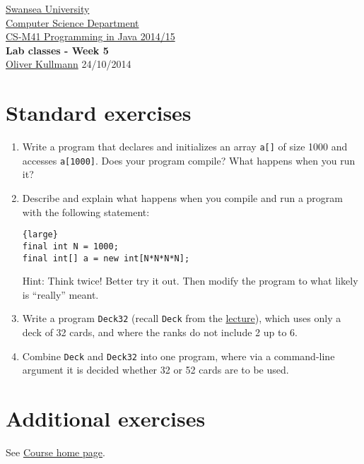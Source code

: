 \documentclass[11pt]{article}
\newcommand{\Java}{\lstset{language=Java,keywordstyle=\bfseries,breaklines,breakindent=30pt}}
\begin{document}
\begin{center}
  \href{http://www.swan.ac.uk/}{Swansea University}\\
  \href{http://www.swan.ac.uk/compsci/}{Computer Science Department}\\[1ex]
  \href{http://cs.swan.ac.uk/~csoliver/ProgrammingJava201415_MgQxuCUrrS/index.html}{CS-M41 Programming in Java 2014/15}\\[1ex]
  \textbf{Lab classes - Week 5}\\
  \href{http://cs.swan.ac.uk/~csoliver}{Oliver Kullmann} 24/10/2014
\end{center}

\section{Standard exercises}
\label{sec:stdex}

\Java

\begin{enumerate}
\item Write a program that declares and initializes an array \texttt{a[]} of size 1000 and accesses \texttt{a[1000]}. Does your program compile? What happens when you run it?
\item Describe and explain what happens when you compile and run a program with the following statement:
  \begin{lstlisting}{large}
final int N = 1000;
final int[] a = new int[N*N*N*N];
  \end{lstlisting}
  Hint: Think twice! Better try it out. Then modify the program to what likely is ``really'' meant.
\item Write a program \texttt{Deck32} (recall \texttt{Deck} from the \href{http://cs.swan.ac.uk/~csoliver/ProgrammingJava201415_MgQxuCUrrS/index.html#LecturesWeek05}{lecture}), which uses only a deck of 32 cards, and where the ranks do not include 2 up to 6.
\item Combine \texttt{Deck} and \texttt{Deck32} into one program, where via a command-line argument it is decided whether 32 or 52 cards are to be used.
\end{enumerate}


\section{Additional exercises}
\label{sec:addex}

See \href{http://cs.swan.ac.uk/~csoliver/ProgrammingJava201415_MgQxuCUrrS/index.html#ExercisesWeek05}{Course home page}.
\end{document}
